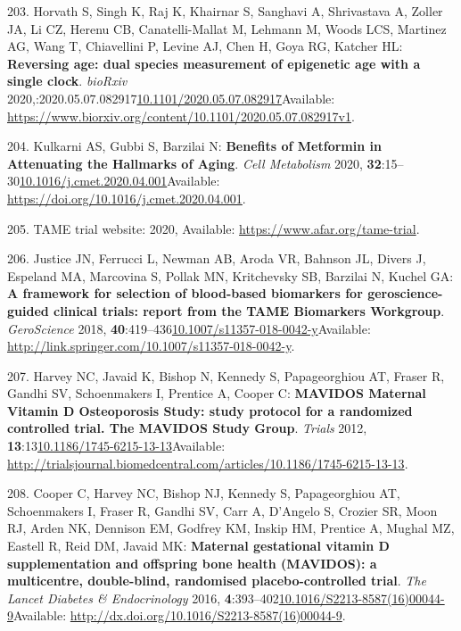 \documentclass[
]{book}
\begin{document}
\leavevmode\hypertarget{ref-Horvath2020}{}%
203. Horvath S, Singh K, Raj K, Khairnar S, Sanghavi A, Shrivastava A, Zoller JA, Li CZ, Herenu CB, Canatelli-Mallat M, Lehmann M, Woods LCS, Martinez AG, Wang T, Chiavellini P, Levine AJ, Chen H, Goya RG, Katcher HL: \textbf{Reversing age: dual species measurement of epigenetic age with a single clock}. \emph{bioRxiv} 2020,:2020.05.07.082917\href{https://doi.org/10.1101/2020.05.07.082917}{10.1101/2020.05.07.082917}Available: \url{https://www.biorxiv.org/content/10.1101/2020.05.07.082917v1}.

\leavevmode\hypertarget{ref-Kulkarni2020}{}%
204. Kulkarni AS, Gubbi S, Barzilai N: \textbf{Benefits of Metformin in Attenuating the Hallmarks of Aging}. \emph{Cell Metabolism} 2020, \textbf{32}:15--30\href{https://doi.org/10.1016/j.cmet.2020.04.001}{10.1016/j.cmet.2020.04.001}Available: \url{https://doi.org/10.1016/j.cmet.2020.04.001}.

\leavevmode\hypertarget{ref-TAME2020}{}%
205. TAME trial website: 2020, Available: \url{https://www.afar.org/tame-trial}.

\leavevmode\hypertarget{ref-Justice2018}{}%
206. Justice JN, Ferrucci L, Newman AB, Aroda VR, Bahnson JL, Divers J, Espeland MA, Marcovina S, Pollak MN, Kritchevsky SB, Barzilai N, Kuchel GA: \textbf{A framework for selection of blood-based biomarkers for geroscience-guided clinical trials: report from the TAME Biomarkers Workgroup}. \emph{GeroScience} 2018, \textbf{40}:419--436\href{https://doi.org/10.1007/s11357-018-0042-y}{10.1007/s11357-018-0042-y}Available: \url{http://link.springer.com/10.1007/s11357-018-0042-y}.

\leavevmode\hypertarget{ref-Harvey2012a}{}%
207. Harvey NC, Javaid K, Bishop N, Kennedy S, Papageorghiou AT, Fraser R, Gandhi SV, Schoenmakers I, Prentice A, Cooper C: \textbf{MAVIDOS Maternal Vitamin D Osteoporosis Study: study protocol for a randomized controlled trial. The MAVIDOS Study Group}. \emph{Trials} 2012, \textbf{13}:13\href{https://doi.org/10.1186/1745-6215-13-13}{10.1186/1745-6215-13-13}Available: \url{http://trialsjournal.biomedcentral.com/articles/10.1186/1745-6215-13-13}.

\leavevmode\hypertarget{ref-Cooper2016}{}%
208. Cooper C, Harvey NC, Bishop NJ, Kennedy S, Papageorghiou AT, Schoenmakers I, Fraser R, Gandhi SV, Carr A, D'Angelo S, Crozier SR, Moon RJ, Arden NK, Dennison EM, Godfrey KM, Inskip HM, Prentice A, Mughal MZ, Eastell R, Reid DM, Javaid MK: \textbf{Maternal gestational vitamin D supplementation and offspring bone health (MAVIDOS): a multicentre, double-blind, randomised placebo-controlled trial}. \emph{The Lancet Diabetes \& Endocrinology} 2016, \textbf{4}:393--402\href{https://doi.org/10.1016/S2213-8587(16)00044-9}{10.1016/S2213-8587(16)00044-9}Available: \url{http://dx.doi.org/10.1016/S2213-8587(16)00044-9}.
\end{document}
